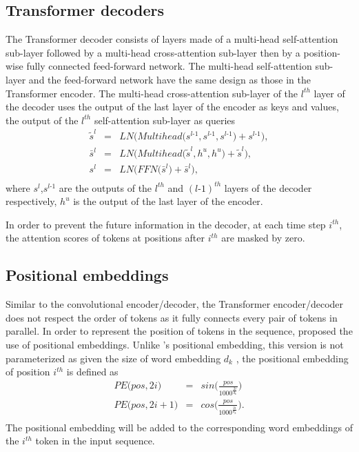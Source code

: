 \subsection{Transformer decoders}
The Transformer decoder consists of layers made of a multi-head self-attention sub-layer followed by a multi-head cross-attention sub-layer then by a position-wise fully connected feed-forward network. The multi-head self-attention sub-layer and the feed-forward network have the same design as those in the Transformer encoder. The multi-head cross-attention sub-layer of the $l^{th}$ layer of the decoder uses the output of the last layer of the encoder as keys and values, the output of the $l^{th}$ self-attention sub-layer as queries
\begin{equation}
\begin{array}{rcl}
\tilde{s}^l &=& LN\bigg( Multihead\big( s^{l\text{-}1},s^{l\text{-}1},s^{l\text{-}1} \big) + s^{l\text{-}1} \bigg), \\
\bar{s}^l &=& LN\bigg( Multihead\big( \tilde{s}^l, h^u, h^u \big) + \tilde{s}^l \bigg), \\
s^l &=& LN\bigg( FFN\big( \bar{s}^l \big) + \bar{s}^l \bigg), \\
\end{array}
\end{equation}
where $s^l$,$s^{l\text{-}1}$ are the outputs of the $l^{th}$ and $(l\text{-}1)^{th}$ layers of the decoder respectively, $h^u$ is the output of the last layer of the encoder.

In order to prevent the future information in the decoder, at each time step $i^{th}$, the attention scores of tokens at positions after $i^{th}$ are masked by zero.

\subsection{Positional embeddings}
Similar to the convolutional encoder/decoder, the Transformer encoder/decoder does not respect the order of tokens as it fully connects every pair of tokens in parallel. In order to represent the position of tokens in the sequence, \citet{Vaswani17attention} proposed the use of positional embeddings. Unlike \citet{Ghering17convolutional}'s positional embedding, this version is not parameterized as given the size of word embedding $d_k$ , the positional embedding of position $i^{th}$ is defined as 
\begin{equation}
\begin{array}{rcl}
PE\big(pos,2i\big) &=& sin \big( \frac{pos}{1000^{\frac{2i}{d_k}}} \big)\\
PE\big(pos,2i+1\big) &=& cos \big( \frac{pos}{1000^{\frac{2i}{d_k}}} \big).\\
\end{array}
\end{equation}
The positional embedding will be added to the corresponding word embeddings of the $i^{th}$ token in the input sequence.
